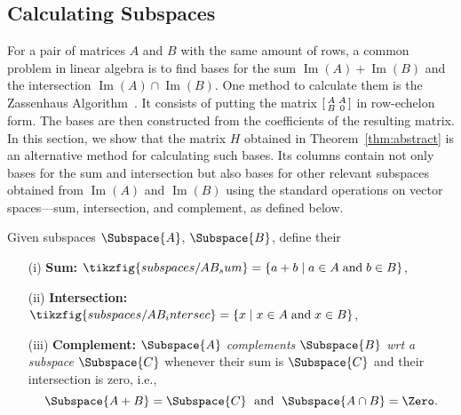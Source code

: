 \documentclass[manyauthors]{fundam}
\DeclareMathOperator{\im}{Im}
\begin{document}
\subsection{Calculating Subspaces}
\label{sec:applications_subspaces}
For a pair of matrices $A$ and $B$ with the same amount of rows,
a common problem in linear algebra is to find bases for the sum $\im(A) + \im(B)$ and the intersection $\im(A) \cap \im(B)$.
One method to calculate them is the Zassenhaus Algorithm~\cite{Fischer2012}. It consists of putting the matrix $\begin{bsmallmatrix} A & A \\ B & 0 \end{bsmallmatrix}$ in row-echelon form. The bases are then constructed from the coefficients of the resulting matrix. In this section, we show that the matrix $H$ obtained in Theorem~\ref{thm:abstract} is an alternative method for calculating such bases. Its columns contain not only bases for the sum and intersection but also bases for other relevant subspaces obtained from $\im(A)$ and $\im(B)$ using the standard operations on vector spaces---sum, intersection, and complement, as defined below.

\begin{definition}
    Given subspaces $\Subspace{A}$, $\Subspace{B}$,
    define their
    \begin{enumerate}
      \item[(i)] \textbf{Sum:}
          $\tikzfig{subspaces/AB_sum}      = \left\{a+b \mid a \in A \;\text{and}\; b \in B \right\}$,
        \item[(ii)] \textbf{Intersection:}
          $\tikzfig{subspaces/AB_intersec} = \left\{x \mid x \in A \;\text{and}\; x \in B \right\}$,
        \item[(iii)] \textbf{Complement:}
          \emph{$\Subspace{A}$ complements $\Subspace{B}$ wrt a subspace $\Subspace{C}$} whenever
        their sum is $\Subspace{C}$ and their intersection is zero, i.e.,
        \[
          \Subspace{A + B} = \Subspace{C} \;\text{ and }\; \Subspace{A \cap B} = \Zero.
        \]
    \end{enumerate}
\end{definition}
\end{document}
